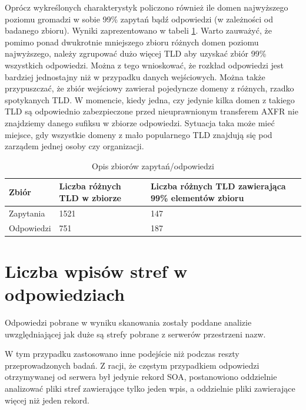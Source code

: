 Oprócz wykreślonych charakterystyk policzono również ile domen najwyższego poziomu gromadzi w sobie 99\% zapytań bądź odpowiedzi
(w zależności od badanego zbioru). Wyniki zaprezentowano w tabeli \ref{cdf_table}. Warto zauważyć, że pomimo ponad dwukrotnie
mniejszego zbioru różnych domen poziomu najwyższego, należy zgrupować dużo więcej TLD aby uzyskać zbiór 99\% wszystkich odpowiedzi.
Można z tego wnioskować, że rozkład odpowiedzi jest bardziej jednostajny niż w przypadku danych wejściowych. Można także przypuszczać,
że zbiór wejściowy zawierał pojedyncze domeny z różnych, rzadko spotykanych TLD. W momencie, kiedy jedna, czy jedynie kilka domen
z takiego TLD są odpowiednio zabezpieczone przed nieuprawnionym transferem AXFR nie znajdziemy danego sufiksu w zbiorze odpowiedzi.
Sytuacja taka może mieć miejsce, gdy wszystkie domeny z mało popularnego TLD znajdują się pod zarządem jednej osoby czy organizacji.

\begin{table}[!hb]
	\centering
	\caption{Opis zbiorów zapytań/odpowiedzi}
	\label{cdf_table}
	\begin{tabular}{|p{}|p{}|p{}|}
		\hline
		\textbf{Zbiór} &
		\textbf{Liczba różnych TLD w zbiorze} &
		\textbf{Liczba różnych TLD zawierająca 99\% elementów zbioru} \\
		\hline\hline
		Zapytania &
		1521 &
		147\\
		\hline
		Odpowiedzi &
		751 &
		187\\
		\hline
	\end{tabular}
\end{table}

\section{Liczba wpisów stref w odpowiedziach}
Odpowiedzi pobrane w wyniku skanowania zostały poddane analizie uwzględniającej jak duże są strefy pobrane z serwerów przestrzeni nazw.

W tym przypadku zastosowano inne podejście niż podczas reszty przeprowadzonych badań. Z racji, że częstym przypadkiem odpowiedzi
otrzymywanej od serwera był jedynie rekord SOA, postanowiono oddzielnie analizować pliki stref zawierające tylko jeden wpis, a
oddzielnie pliki zawierające więcej niż jeden rekord.

